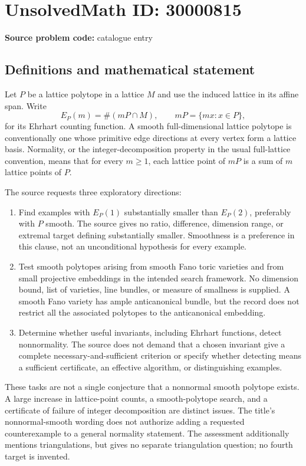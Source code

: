\documentclass[11pt]{article}
\begin{document}
\section*{UnsolvedMath ID: 30000815}
\textbf{Source problem code:} catalogue entry
\subsection{Definitions and mathematical statement}
Let $P$ be a lattice polytope in a lattice $M$ and use the induced lattice in its affine span. Write
\[
 E_P(m)=\#(mP\cap M),\qquad mP=\{mx:x\in P\},
\]
for its Ehrhart counting function. A smooth full-dimensional lattice polytope is conventionally one whose primitive edge directions at every vertex form a lattice basis. Normality, or the integer-decomposition property in the usual full-lattice convention, means that for every $m\ge1$, each lattice point of $mP$ is a sum of $m$ lattice points of $P$.

The source requests three exploratory directions:
\begin{enumerate}
\item Find examples with $E_P(1)$ substantially smaller than $E_P(2)$, preferably with $P$ smooth. The source gives no ratio, difference, dimension range, or extremal target defining substantially smaller. Smoothness is a preference in this clause, not an unconditional hypothesis for every example.
\item Test smooth polytopes arising from smooth Fano toric varieties and from small projective embeddings in the intended search framework. No dimension bound, list of varieties, line bundles, or measure of smallness is supplied. A smooth Fano variety has ample anticanonical bundle, but the record does not restrict all the associated polytopes to the anticanonical embedding.
\item Determine whether useful invariants, including Ehrhart functions, detect nonnormality. The source does not demand that a chosen invariant give a complete necessary-and-sufficient criterion or specify whether detecting means a sufficient certificate, an effective algorithm, or distinguishing examples.
\end{enumerate}

These tasks are not a single conjecture that a nonnormal smooth polytope exists. A large increase in lattice-point counts, a smooth-polytope search, and a certificate of failure of integer decomposition are distinct issues. The title's nonnormal-smooth wording does not authorize adding a requested counterexample to a general normality statement. The assessment additionally mentions triangulations, but gives no separate triangulation question; no fourth target is invented.
\end{document}
